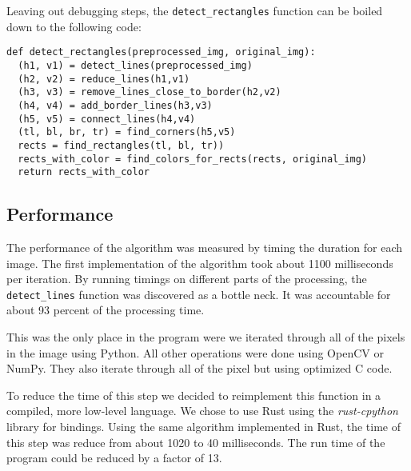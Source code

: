 Leaving out debugging steps, the \texttt{detect\_rectangles} function can be
boiled down to the following code:

\begin{lstlisting}
def detect_rectangles(preprocessed_img, original_img):
  (h1, v1) = detect_lines(preprocessed_img)
  (h2, v2) = reduce_lines(h1,v1)
  (h3, v3) = remove_lines_close_to_border(h2,v2)
  (h4, v4) = add_border_lines(h3,v3)
  (h5, v5) = connect_lines(h4,v4)
  (tl, bl, br, tr) = find_corners(h5,v5)
  rects = find_rectangles(tl, bl, tr))
  rects_with_color = find_colors_for_rects(rects, original_img)
  return rects_with_color
\end{lstlisting}

\subsection{Performance}

The performance of the algorithm was measured by timing the duration for each
image. The first implementation of the algorithm took about 1100 milliseconds per
iteration. By running timings on different parts of the processing, the
\texttt{detect\_lines} function was discovered as a bottle neck. It was
accountable for about 93 percent of the processing time.

This was the only place in the program were we iterated through all of the pixels
in the image using Python. All other operations were done using OpenCV or NumPy.
They also iterate through all of the pixel but using optimized C code.

To reduce the time of this step we decided to reimplement this function in a
compiled, more low-level language. We chose to use Rust using the \textit{rust-cpython}
library for bindings. Using the same algorithm implemented in Rust, the time of
this step was reduce from about 1020 to 40 milliseconds. The run time of the
program could be reduced by a factor of 13.

%
%
